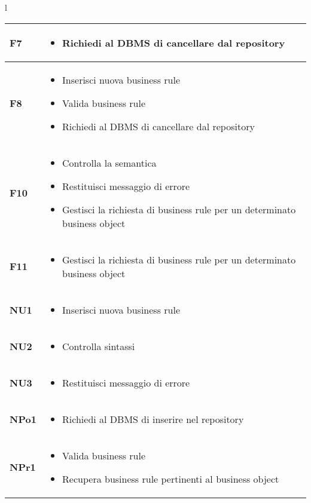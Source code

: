 {\begin{tabular}{l}
\begin{tabular}{||p{2cm}||p{10cm}||} \hline
\textbf{F7} & \begin{itemize}
\item Richiedi al DBMS di cancellare dal repository
\end{itemize}\\ \hline


\textbf{F8} & \begin{itemize}
\item Inserisci nuova business rule
\item Valida business rule
\item Richiedi al DBMS di cancellare dal repository
\end{itemize} \\ \hline
\textbf{F10} & \begin{itemize}
\item Controlla la semantica
\item Restituisci messaggio di errore
\item Gestisci la richiesta di business rule per un determinato business object
\end{itemize} \\ \hline
\textbf{F11} & \begin{itemize}
\item Gestisci la richiesta di business rule per un determinato business object
\end{itemize} \\ \hline
\textbf{NU1} & \begin{itemize}
\item Inserisci nuova business rule
\end{itemize} \\ \hline
\textbf{NU2} & \begin{itemize}
\item Controlla sintassi
\end{itemize} \\ \hline
\textbf{NU3} & \begin{itemize}
\item Restituisci messaggio di errore
\end{itemize} \\ \hline
\textbf{NPo1} & \begin{itemize}
\item Richiedi al DBMS di inserire nel repository
\end{itemize} \\ \hline
\textbf{NPr1} & \begin{itemize}
\item Valida business rule
\item Recupera business rule pertinenti al business object
\end{itemize} \\ \hline


\end{tabular}
\end{tabular}}
